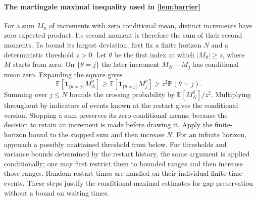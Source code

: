 \documentclass[twoside,11pt]{article}
\DeclareRobustCommand{\reviewbarstart}{%
  \ifhmode %
    \vadjust{\vbox to 0pt{%
      \vskip-\ht\strutbox %
      \vskip-\dp\strutbox %
      \cbstart[\changebarwidth] %
      \vss %
    }}%
  \else %
    \cbstart[\changebarwidth]%
  \fi %
} %
\providecommand{\DIFadd}[1]{#1} %
\providecommand{\DIFaddbegin}{\reviewbarstart} %
\providecommand{\DIFaddend}{\protect\cbend} %
\def\DIFadd#1{#1}%
\def\DIFaddbegin{}%
\def\DIFaddend{}%
\begin{document}
\DIFaddbegin \paragraph{\DIFadd{The martingale maximal inequality used in \autoref{lem:barrier}}}
\label{app: martingale bound}
\DIFadd{For a sum $M_n$ of increments with zero conditional mean, distinct increments have zero expected product. Its second moment is therefore the sum of their second moments. To bound its largest deviation, first fix a finite horizon $N$ and a deterministic threshold $z>0$. Let $\theta$ be the first index at which $|M_\theta|\ge z$, where $M$ starts from zero.
On $\{\theta=j\}$ the later increment $M_N-M_j$ has conditional mean zero. Expanding the square gives
}\[
\DIFadd{\mathbb E}[\DIFadd{\mathbf1_{\{\theta=j\}}M_N^2}]
\DIFadd{\ge \mathbb E}[\DIFadd{\mathbf1_{\{\theta=j\}}M_j^2}]
\DIFadd{\ge z^2\mathbb P(\theta=j).
}\]
\DIFadd{Summing over $j\le N$ bounds the crossing probability by $\mathbb E[M_N^2]/z^2$.
Multiplying throughout by indicators of events known at the restart gives the conditional version. Stopping a sum preserves its zero conditional means, because the decision to retain an increment is made before drawing it. Apply the finite-horizon bound to the stopped sum and then increase $N$. For an infinite horizon, approach a possibly unattained threshold from below. For thresholds and variance bounds determined by the restart history, the same argument is applied conditionally; one may first restrict them to bounded ranges and then increase those ranges. Random restart times are handled on their individual finite-time events. These steps justify the conditional maximal estimates for gap preservation without a bound on waiting times.
}\DIFaddend 




 \DIFaddbegin {}
\DIFaddend 






\end{document}

